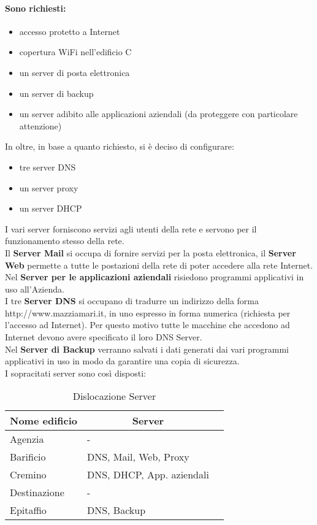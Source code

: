 \documentclass[a4paper,11pt]{article}
\begin{document}
\paragraph{Sono richiesti:} 
\begin{itemize}
\item accesso protetto a Internet
\item copertura WiFi nell'edificio C
\item un server di posta elettronica
\item un server di backup 
\item un server adibito alle applicazioni aziendali (da proteggere con particolare attenzione)
\end{itemize}
In oltre, in base a quanto richiesto, si è deciso di configurare:
\begin{itemize}
\item tre server DNS
\item un server proxy 
\item un server DHCP
\end{itemize}
I vari server forniscono servizi agli utenti della rete e servono per il funzionamento stesso della rete.\\
Il \textbf{Server Mail} si occupa di fornire servizi per la posta elettronica, il \textbf{Server Web} permette a tutte le postazioni della rete di poter accedere alla rete Internet.\\
Nel \textbf{Server per le applicazioni aziendali} risiedono programmi applicativi in uso all’Azienda.\\
I tre \textbf{Server DNS} si occupano di tradurre un indirizzo della forma http://www.mazziamari.it, in uno espresso in forma numerica (richiesta per l’accesso ad Internet). Per questo motivo tutte le macchine che accedono ad Internet devono avere specificato il loro DNS Server.\\
Nel \textbf{Server di Backup} verranno salvati i dati generati dai vari programmi applicativi in uso in modo da garantire una copia di sicurezza.\\
I sopracitati server sono così disposti:
\begin{table}[H]
\centering
\label{riepilogo}
\begin{tabular}{|l|l|l|}
\hline
\multicolumn{1}{|c|}{\textbf{Nome edificio}} & \multicolumn{1}{c|}{\textbf{Server}} \\ \hline
Agenzia & - \\ \hline
Barificio & DNS, Mail, Web, Proxy \\ \hline
Cremino & DNS, DHCP, App. aziendali \\ \hline
Destinazione & - \\ \hline
Epitaffio & DNS, Backup \\ \hline
\end{tabular}
\caption{Dislocazione Server}
\end{table}
\newpage
\end{document}
